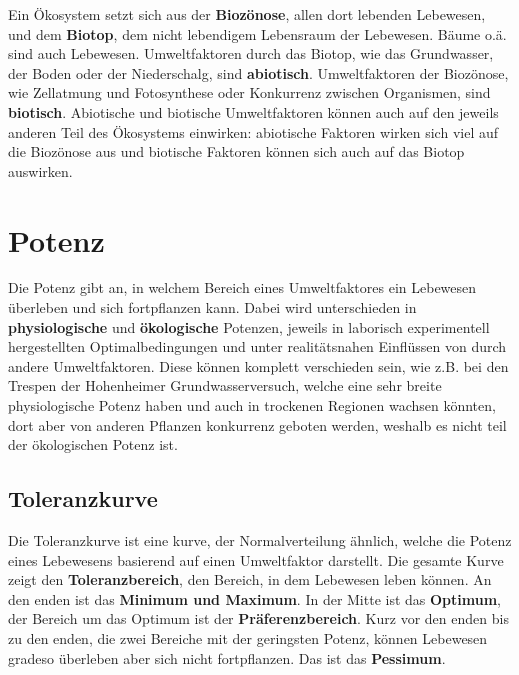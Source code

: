 \documentclass{article}
\begin{document}
\noindent Ein Ökosystem setzt sich aus der \textbf{Biozönose}, allen dort lebenden Lebewesen, und dem \textbf{Biotop}, dem nicht lebendigem Lebensraum der Lebewesen. Bäume o.ä. sind auch Lebewesen. \newline
Umweltfaktoren durch das Biotop, wie das Grundwasser, der Boden oder der Niederschalg, sind \textbf{abiotisch}. Umweltfaktoren der Biozönose, wie Zellatmung und Fotosynthese oder Konkurrenz zwischen Organismen, sind \textbf{biotisch}. Abiotische und biotische Umweltfaktoren können auch auf den jeweils anderen Teil des Ökosystems einwirken: abiotische Faktoren wirken sich viel auf die Biozönose aus und biotische Faktoren können sich auch auf das Biotop auswirken.
 
\section{Potenz} 
Die Potenz gibt an, in welchem Bereich eines Umweltfaktores ein Lebewesen überleben und sich fortpflanzen kann. Dabei wird unterschieden in \textbf{physiologische} und \textbf{ökologische} Potenzen, jeweils in laborisch experimentell hergestellten Optimalbedingungen und unter realitätsnahen Einflüssen von durch andere Umweltfaktoren. \newline
Diese können komplett verschieden sein, wie z.B. bei den Trespen der Hohenheimer Grundwasserversuch, welche eine sehr breite physiologische Potenz haben und auch in trockenen Regionen wachsen könnten, dort aber von anderen Pflanzen konkurrenz geboten werden, weshalb es nicht teil der ökologischen Potenz ist.
 
\subsection{Toleranzkurve}
Die Toleranzkurve ist eine kurve, der Normalverteilung ähnlich, welche die Potenz eines Lebewesens basierend auf einen Umweltfaktor darstellt. Die gesamte Kurve zeigt den \textbf{Toleranzbereich}, den Bereich, in dem Lebewesen leben können. An den enden ist das \textbf{Minimum und Maximum}. In der Mitte ist das \textbf{Optimum}, der Bereich um das Optimum ist der \textbf{Präferenzbereich}. Kurz vor den enden bis zu den enden, die zwei Bereiche mit der geringsten Potenz, können Lebewesen gradeso überleben aber sich nicht fortpflanzen. Das ist das \textbf{Pessimum}.
  
\end{document}
